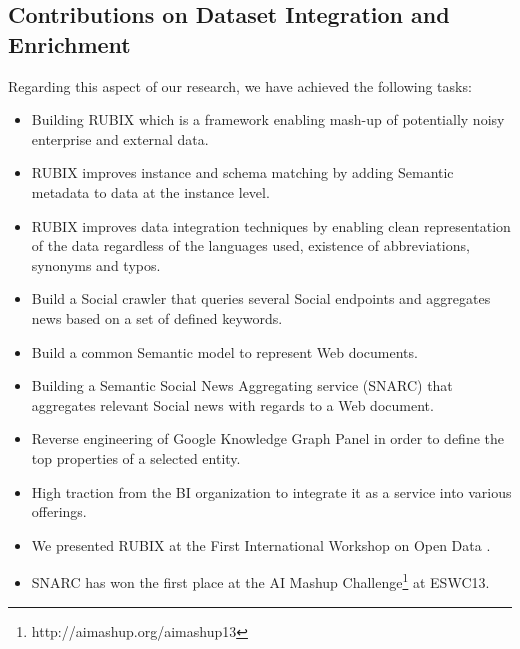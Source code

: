 \documentclass[onecolumn, crcready]{iosart2c}
\begin{document}
\subsection{Contributions on Dataset Integration and Enrichment}
Regarding this aspect of our research, we have achieved the following tasks:
 \begin{itemize}
 \item Building RUBIX which is a framework enabling mash-up of potentially noisy enterprise and external data.
 \item RUBIX improves instance and schema matching by adding Semantic metadata to data at the instance level.
 \item RUBIX improves data integration techniques by enabling clean representation of the data regardless of the languages used, existence of abbreviations, synonyms and typos. 
 \item Build a Social crawler that queries several Social endpoints and aggregates news based on a set of defined keywords.
 \item Build a common Semantic model to represent Web documents.
 \item Building a Semantic Social News Aggregating service (SNARC) \cite{DBLP:conf/esws/AssafST13} that aggregates relevant Social news with regards to a Web document.
 \item Reverse engineering of Google Knowledge Graph Panel in order to define the top properties of a selected entity.
 \item High traction from the BI organization to integrate it as a service into various offerings.
 \item We presented RUBIX at the First International Workshop on Open Data \cite{Assaf:2012:RFI:2422604.2422607}\cite{DBLP:journals/corr/abs-1205-2691}.
 \item SNARC has won the first place at the AI Mashup Challenge\footnote{http://aimashup.org/aimashup13} at ESWC13.
\end{itemize}
\end{document}
